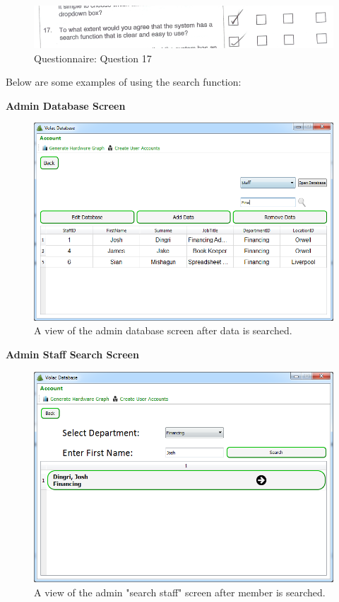 \begin{figure}[H]
    \includegraphics[width=\textwidth]{./Evaluation/EvaluationQuestionnaire/17.png}
    \caption{Questionnaire: Question 17} 
\end{figure}

Below are some examples of using the search function:

\textbf{Admin Database Screen}

\begin{figure}[H]
    \includegraphics[width=\textwidth]{./Evaluation/Images/afteradminsearch.png}
    \caption{A view of the admin database screen after data is searched.} 
\end{figure}

\textbf{Admin Staff Search Screen}

\begin{figure}[H]
    \includegraphics[width=\textwidth]{./Evaluation/Images/afteradv.png}
    \caption{A view of the admin "search staff" screen after member is searched.} \label{advsearch}
\end{figure}

